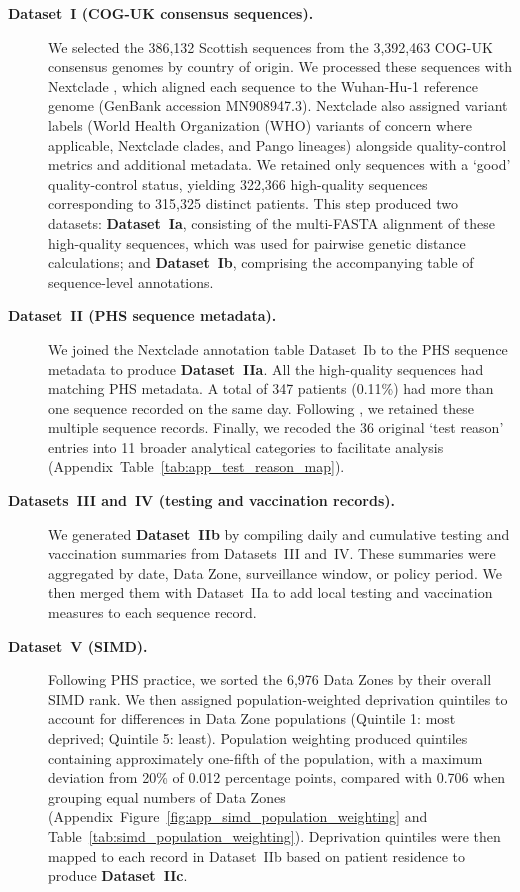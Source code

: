 \begin{description}
    \item[\textbf{Dataset~I (COG-UK consensus sequences).}] We selected the 386,132 Scottish sequences from the 3,392,463 COG-UK consensus genomes by country of origin. We processed these sequences with Nextclade \citep{Aksamentov2021}, which aligned each sequence to the Wuhan-Hu-1 reference genome (GenBank accession MN908947.3). Nextclade also assigned variant labels (World Health Organization (WHO) variants of concern where applicable, Nextclade clades, and Pango lineages) alongside quality-control metrics and additional metadata. We retained only sequences with a `good' quality-control status, yielding 322,366 high-quality sequences corresponding to 315,325 distinct patients. This step produced two datasets: \textbf{Dataset~Ia}, consisting of the multi-FASTA alignment of these high-quality sequences, which was used for pairwise genetic distance calculations; and \textbf{Dataset~Ib}, comprising the accompanying table of sequence-level annotations.

    \item[\textbf{Dataset~II (PHS sequence metadata).}] We joined the Nextclade annotation table Dataset~Ib to the PHS sequence metadata to produce \textbf{Dataset~IIa}. All the high-quality sequences had matching PHS metadata. A total of 347 patients (0.11\%) had more than one sequence recorded on the same day. Following \citet{Gamza2024}, we retained these multiple sequence records. Finally, we recoded the 36 original `test reason' entries into 11 broader analytical categories to facilitate analysis (Appendix~Table~\ref{tab:app_test_reason_map}).

	\item[\textbf{Datasets~III and~IV (testing and vaccination records).}] We generated \textbf{Dataset~IIb} by compiling daily and cumulative testing and vaccination summaries from Datasets~III and~IV. These summaries were aggregated by date, Data Zone, surveillance window, or policy period. We then merged them with Dataset~IIa to add local testing and vaccination measures to each sequence record.

	\item[\textbf{Dataset~V (SIMD).}] Following PHS practice, we sorted the 6,976 Data Zones by their overall SIMD rank. We then assigned population-weighted deprivation quintiles to account for differences in Data Zone populations (Quintile 1: most deprived; Quintile 5: least). Population weighting produced quintiles containing approximately one-fifth of the population, with a maximum deviation from 20\% of 0.012 percentage points, compared with 0.706 when grouping equal numbers of Data Zones (Appendix~Figure~\ref{fig:app_simd_population_weighting} and Table~\ref{tab:simd_population_weighting}). Deprivation quintiles were then mapped to each record in Dataset~IIb based on patient residence to produce \textbf{Dataset~IIc}.


\end{description}
